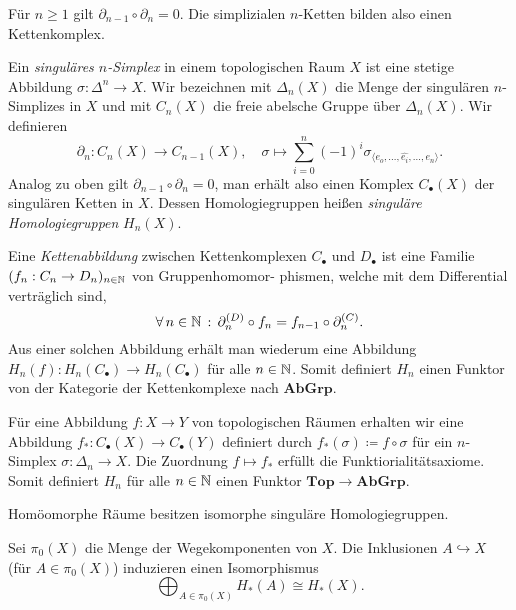 \documentclass{cheat-sheet}
\newcommand{\angles}[1]{{\langle #1 \rangle}}
\newcommand{\CC}[1]{{#1}_{\bullet}} %
\newcommand{\Top}{\mathbf{Top}} %
\newcommand{\AbGrp}{\mathbf{AbGrp}} %
\begin{document}
\begin{prop}
  Für $n \geq 1$ gilt $\partial_{n-1} \circ \partial_n = 0$. Die simplizialen $n$-Ketten bilden also einen Kettenkomplex.
\end{prop}

\begin{defn}
  Ein \emph{singuläres $n$-Simplex} in einem topologischen Raum $X$ ist eine stetige Abbildung $\sigma : \Delta^n \to X$. Wir bezeichnen mit $\Delta_n(X)$ die Menge der singulären $n$-Simplizes in $X$ und mit $C_n(X)$ die freie abelsche Gruppe über $\Delta_n(X)$. Wir definieren
  \[
    \partial_n : C_n(X) \to C_{n-1}(X), \quad
    \sigma \mapsto \sum_{i=0}^n (-1)^i \sigma_{\angles{e_o,\ldots,\hat{e_i},\ldots,e_n}}.
  \]
  Analog zu oben gilt $\partial_{n-1} \circ \partial_n = 0$, man erhält also einen Komplex $\CC{C}(X)$ der singulären Ketten in $X$. Dessen Homologiegruppen heißen \emph{singuläre Homologiegruppen} $H_n(X)$.
\end{defn}

\begin{defn}
  Eine \emph{Kettenabbildung} zwischen Kettenkomplexen $\CC{C}$ und $\CC{D}$ ist eine Familie $(f_n : C_n \to D_n)_{n \in \mathbb{N}}$ von Gruppenhomomor- phismen, welche mit dem Differential verträglich sind, \dh{}
  \[ \forall \, {n \in \mathbb{N}} \,:\, \partial_n^{(D)} \circ f_n = f_{n-1} \circ \partial_n^{(C)}. \]
  Aus einer solchen Abbildung erhält man wiederum eine Abbildung $H_n(f) : H_n(\CC{C}) \to H_n(\CC{C})$ für alle $n \in \mathbb{N}$. Somit definiert $H_n$ einen Funktor von der Kategorie der Kettenkomplexe nach $\AbGrp$.
\end{defn}


\begin{defn}
  Für eine Abbildung $f : X \to Y$ von topologischen Räumen erhalten wir eine Abbildung $f_* : \CC{C}(X) \to \CC{C}(Y)$ definiert durch $f_*(\sigma) \coloneqq f \circ \sigma$ für ein $n$-Simplex $\sigma : \Delta_n \to X$. Die Zuordnung $f \mapsto f_*$ erfüllt die Funktiorialitätsaxiome. Somit definiert $H_n$ für alle $n \in \mathbb{N}$ einen Funktor $\Top \to \AbGrp$.
\end{defn}

\begin{kor}
  Homöomorphe Räume besitzen isomorphe singuläre Homologiegruppen.
\end{kor}


\begin{prop}
  Sei $\pi_0(X)$ die Menge der Wegekomponenten von $X$. Die Inklusionen $A \hookrightarrow X$ (für $A \in \pi_0(X)$) induzieren einen Isomorphismus
  \[ \bigoplus_{A \in \pi_0(X)} H_*(A) \cong H_*(X). \]
\end{prop}
\end{document}
